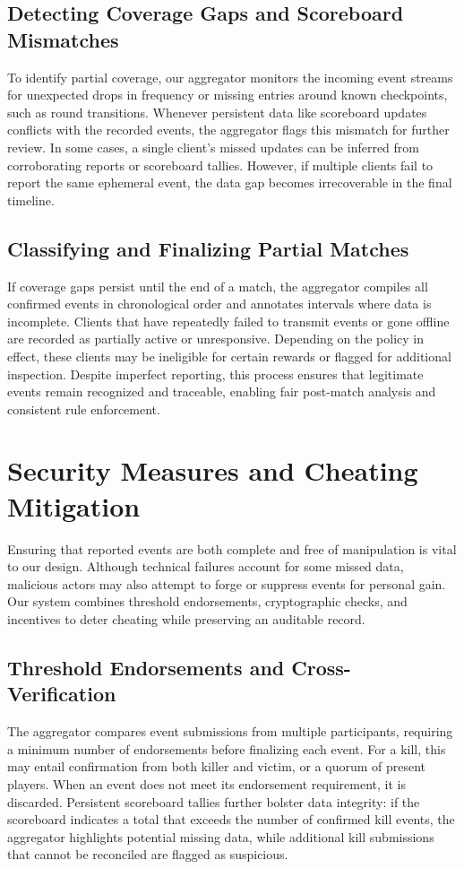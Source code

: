 \documentclass[11pt]{article}
\begin{document}
\subsection{Detecting Coverage Gaps and Scoreboard Mismatches}
To identify partial coverage, our aggregator monitors the incoming event streams for 
unexpected drops in frequency or missing entries around known checkpoints, such as round 
transitions. Whenever persistent data like scoreboard updates conflicts with the recorded 
events, the aggregator flags this mismatch for further review. In some cases, a single 
client’s missed updates can be inferred from corroborating reports or scoreboard tallies. 
However, if multiple clients fail to report the same ephemeral event, the data gap becomes 
irrecoverable in the final timeline.

\subsection{Classifying and Finalizing Partial Matches}
If coverage gaps persist until the end of a match, the aggregator compiles all confirmed 
events in chronological order and annotates intervals where data is incomplete. Clients 
that have repeatedly failed to transmit events or gone offline are recorded as partially 
active or unresponsive. Depending on the policy in effect, these clients may be ineligible 
for certain rewards or flagged for additional inspection. Despite imperfect reporting, 
this process ensures that legitimate events remain recognized and traceable, enabling 
fair post-match analysis and consistent rule enforcement.


\section{Security Measures and Cheating Mitigation}
\label{sec:cheatingMitigation}

Ensuring that reported events are both complete and free of manipulation is vital to our 
design. Although technical failures account for some missed data, malicious actors may 
also attempt to forge or suppress events for personal gain. Our system combines threshold 
endorsements, cryptographic checks, and incentives to deter cheating while preserving 
an auditable record.

\subsection{Threshold Endorsements and Cross-Verification}
The aggregator compares event submissions from multiple participants, requiring a minimum 
number of endorsements before finalizing each event. For a kill, this may entail 
confirmation from both killer and victim, or a quorum of present players. When an 
event does not meet its endorsement requirement, it is discarded. Persistent scoreboard 
tallies further bolster data integrity: if the scoreboard indicates a total that exceeds 
the number of confirmed kill events, the aggregator highlights potential missing data, 
while additional kill submissions that cannot be reconciled are flagged as suspicious.
\end{document}
